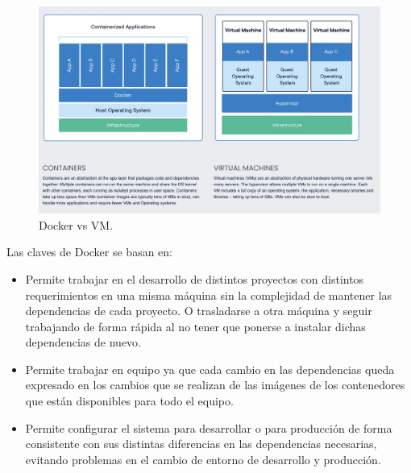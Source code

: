 \begin{figure}[H]
    \centering
    \includegraphics[height=0.3\textheight]{./part/Proyecto_ejecutivo/memoria_descriptiva/prestaciones/docker/img/dockerVsVM}
    \caption{Docker vs VM.\cite{docker}}\label{fig:Docker vs VM}
\end{figure}

Las claves de Docker se basan en:
\begin{itemize}
    \item Permite trabajar en el desarrollo de distintos proyectos con distintos requerimientos en una misma máquina sin la complejidad de mantener las dependencias de cada proyecto.
    O trasladarse a otra máquina y seguir trabajando de forma rápida al no tener que ponerse a instalar dichas dependencias de nuevo.
    \item Permite trabajar en equipo ya que cada cambio en las dependencias queda expresado en los cambios que se realizan de las imágenes de los contenedores que están disponibles para todo el equipo.
    \item Permite configurar el sistema para desarrollar o para producción de forma consistente con sus distintas diferencias en las dependencias necesarias, evitando problemas en el cambio de entorno de desarrollo y producción.
\end{itemize}